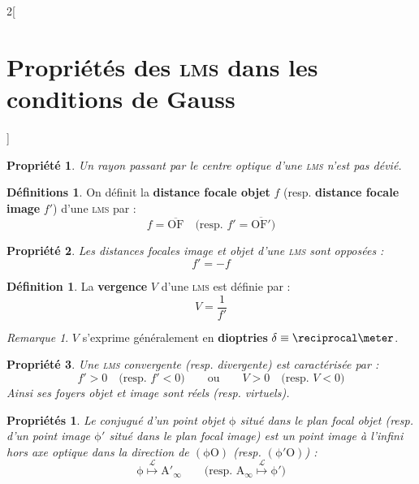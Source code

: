 \documentclass[french]{book}
\newtheorem*{propriete}{Propriété}
\newtheorem*{proprietes}{Propriétés}
\theoremstyle{definition}
\newtheorem*{definition}{Définition}
\newtheorem*{definitions}{Définitions}
\theoremstyle{remark}
\newtheorem*{remarque}{Remarque}
\newcommand*{\point}[1]{\mathrm{#1}}
\newcommand*{\droite}[1]{\mathrm{#1}}
\newcommand*{\algebrique}[1]{\overline{#1}}
\newcommand*{\tdef}[1]{\textbf{#1}}
\newcommand*{\imp}[1]{\emph{#1}}
\newcommand*{\abr}[1]{\textsc{#1}}
\begin{document}
\begin{landscape}
\begin{multicols*}{2}[\section{Propriétés des \abr{lms} dans les conditions de Gauss}]

\begin{propriete}
Un rayon passant par le \imp{centre optique} d'une \abr{lms} n'est pas dévié.
\end{propriete}

\begin{definitions}
On définit la \tdef{distance focale objet} $f$ (resp. \tdef{distance focale image} $f'$) d'une \abr{lms} par :
\[f = \algebrique{\point{O}\point{F}} \quad \text{(resp. } f' = \algebrique{\point{O}\point{F'}} \text{)}\]
\end{definitions}

\begin{propriete}
Les distances focales image et objet d'une \imp{\abr{lms}} sont opposées :
\[f' = -f\]
\end{propriete}

\begin{definition}
La \tdef{vergence} $V$ d'une \abr{lms} est définie par : 
\[V = \frac{1}{f'}\]
\end{definition}

\begin{remarque}
$V$ s'exprime généralement en \tdef{dioptries} $\delta \equiv \reciprocal\meter$.
\end{remarque}

\begin{propriete}
Une \imp{\abr{lms} convergente} (resp. \imp{divergente}) est caractérisée par :
\[f' > 0 \quad \text{(resp. } f' < 0 \text{)} \qquad \text{ou} \qquad V > 0 \quad \text{(resp. } V < 0 \text{)}\]
\noindent Ainsi ses foyers objet et image sont réels (resp. virtuels).
\end{propriete}

\begin{proprietes}
Le conjugué d'un point objet $\point{\phi}$ situé dans le plan focal objet (resp. d'un point image $\point{\phi'}$ situé dans le plan focal image) est un point image à l'infini hors axe optique dans la direction de $\droite{\left(\point{\phi}\point{O}\right)}$ (resp. $\droite{\left(\point{\phi'}\point{O}\right)}$) :
\[\point{\phi} \stackrel{\mathscr{L}}{\longmapsto} \point{A'}_{\infty}  \qquad \text{(resp. } \point{A}_{\infty} \stackrel{\mathscr{L}}{\longmapsto} \point{\phi'} \text{)}\]
\end{proprietes}


\end{multicols*}
\end{landscape}
\end{document}
